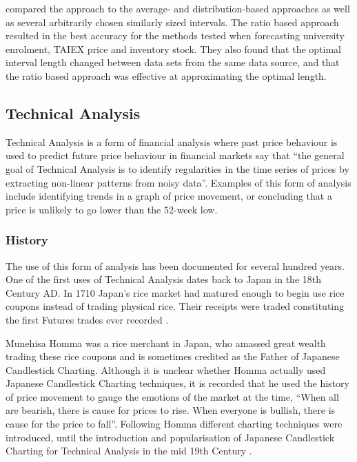 \documentclass{article}
\theoremstyle{definition}
\begin{document}
\cite{huarng2006ratio} compared the approach to the average- and distribution-based approaches as well as several arbitrarily chosen similarly sized intervals. The ratio based approach resulted in the best accuracy for the methods tested when forecasting university enrolment, TAIEX price and inventory stock. They also found that the optimal interval length changed between data sets from the same data source, and that the ratio based approach was effective at approximating the optimal length.

\subsection{Technical Analysis}

Technical Analysis is a form of financial analysis where past price behaviour is used to predict future price behaviour in financial markets \cite{foundations} say that ``the general goal of Technical Analysis is to identify regularities in the time series of prices by extracting non-linear patterns from noisy data''. Examples of this form of analysis include identifying trends in a graph of price movement, or concluding that a price is unlikely to go lower than the 52-week low.

\subsubsection{History}

The use of this form of analysis has been documented for several hundred years. One of the first uses of Technical Analysis dates back to Japan in the 18th Century AD. In 1710 Japan's rice market had matured enough to begin use rice coupons instead of trading physical rice. Their receipts were traded constituting the first Futures trades ever recorded \citep[p.15]{jcct1991}. 

Munehisa Homma was a rice merchant in Japan, who amassed great wealth trading these rice coupons and is sometimes credited as the Father of Japanese Candlestick Charting. Although it is unclear whether Homma actually used Japanese Candlestick Charting techniques, it is recorded that he used the history of price movement to gauge the emotions of the market at the time, ``When all are bearish, there is cause for prices to rise. When everyone is bullish, there is cause for the price to fall''. Following Homma different charting techniques were introduced, until the introduction and popularisation of Japanese Candlestick Charting for Technical Analysis in the mid 19th Century \citep[p.18]{jcct1994}.
\end{document}
